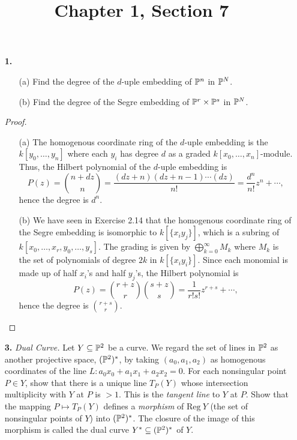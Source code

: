 \documentclass{article}
\title{Chapter 1, Section 7}
\begin{document}
\maketitle
\begin{enumerate} [label=\textbf{\arabic*.}, leftmargin=0cm]

\item[\textbf{1.}] \begin{itemize}
  \item[(a)] Find the degree of the $d$-uple embedding of $\mathbb{P}^n$ in $\mathbb{P}^N$.
  \item[(b)] Find the degree of the Segre embedding of $\mathbb{P}^r \times \mathbb{P}^s$ in $\mathbb{P}^N$.
\end{itemize}

\begin{proof} $ $ \vspace{0pt}
  \begin{itemize}
    \item[(a)] The homogenous coordinate ring of the $d$-uple embedding is the $k[y_0, \dots, y_n]$ where each $y_i$ has degree $d$ as a graded $k[x_0, \dots, x_n]$-module. Thus, the Hilbert polynomial of the $d$-uple embedding is
    \begin{equation*}
      P(z) = {n + dz \choose n} = \frac{(dz + n)(dz + n - 1) \cdots (dz)}{n!} = \frac{d^n}{n!}z^n + \cdots,
    \end{equation*}
    hence the degree is $d^n$.

    \item[(b)] We have seen in Exercise 2.14 that the homogenous coordinate ring of the Segre embedding is isomorphic to $k[\{x_i y_j \}]$, which is a subring of $k[x_0, \dots, x_r, y_0, \dots, y_s]$. The grading is given by $\bigoplus_{k = 0}^\infty M_k$ where $M_k$ is the set of polynomials of degree $2k$ in $k[\{ x_i y_i \}]$. Since each monomial is made up of half $x_i$'s and half $y_j$'s, the Hilbert polynomial is
    \begin{equation*}
      P(z) = {r + z \choose r} {s + z \choose s} = \frac{1}{r!s!}z^{r + s} + \cdots,
    \end{equation*}
    hence the degree is ${r + s \choose r}$.
  \end{itemize}
\end{proof}

\item[\textbf{3.}] \textit{Dual Curve.} Let $Y \subseteq \mathbb{P}^2$ be a curve. We regard the set of lines in $\mathbb{P}^2$ as another projective space, $(\mathbb{P}^2)^*$, by taking $(a_0, a_1, a_2)$ as homogenous coordinates of the line $L : a_0 x_0 + a_1 x_1 + a_2 x_2 = 0$. For each nonsingular point $P \in Y$, show that there is a unique line $T_P(Y)$ whose intersection multiplicity with $Y$ at $P$ is $ > 1$. This is the \textit{tangent line} to $Y$ at $P$. Show that the mapping $P \mapsto T_P(Y)$ defines a \textit{morphism} of $\text{Reg}~Y$ (the set of nonsingular points of $Y$) into $(\mathbb{P}^2)^*$. The closure of the image of this morphism is called the dual curve $Y^* \subseteq (\mathbb{P}^2)^*$ of $Y$.


\end{enumerate}
\end{document}
